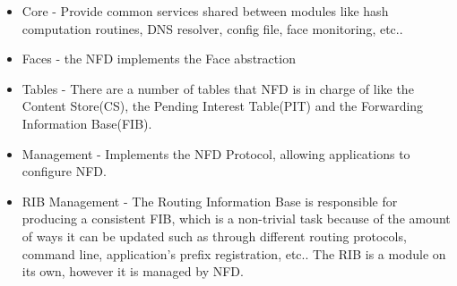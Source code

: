 \begin{itemize}
\item Core - Provide common services shared between modules like hash computation routines, DNS resolver, config file, face monitoring, etc.. \cite{029}
\item Faces - the NFD implements the Face abstraction
\item Tables - There are a number of tables that NFD is in charge of like the Content Store(CS), the Pending Interest Table(PIT) and the Forwarding Information Base(FIB).
\item Management - Implements the NFD Protocol, allowing applications to configure NFD.
\item RIB Management - The Routing Information Base is responsible for producing a consistent FIB, which is a non-trivial task because of the amount of ways it can be updated such as through different routing protocols, command line, application's prefix registration, etc.. The RIB is a module on its own, however it is managed by NFD.
\end{itemize}

